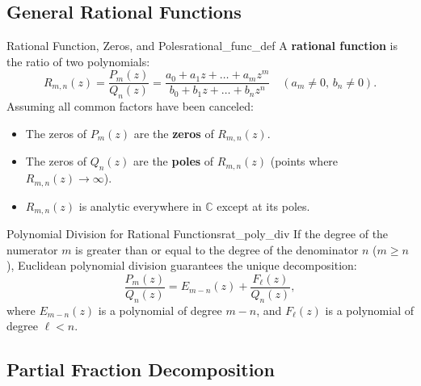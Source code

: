 \subsection{General Rational Functions}

\begin{definition}{Rational Function, Zeros, and Poles}{rational_func_def}
A \textbf{rational function} is the ratio of two polynomials:
\begin{equation}
R_{m, n}(z) = \frac{P_m(z)}{Q_n(z)} = \frac{a_0 + a_1 z + \dots + a_m z^m}{b_0 + b_1 z + \dots + b_n z^n} \quad (a_m \neq 0, \, b_n \neq 0).
\end{equation}
Assuming all common factors have been canceled:
\begin{itemize}
    \item The zeros of $P_m(z)$ are the \textbf{zeros} of $R_{m, n}(z)$.
    \item The zeros of $Q_n(z)$ are the \textbf{poles} of $R_{m, n}(z)$ (points where $R_{m, n}(z) \to \infty$).
    \item $R_{m, n}(z)$ is analytic everywhere in $\mathbb{C}$ except at its poles.
\end{itemize}
\end{definition}

\begin{proposition}{Polynomial Division for Rational Functions}{rat_poly_div}
If the degree of the numerator $m$ is greater than or equal to the degree of the denominator $n$ ($m \ge n$), Euclidean polynomial division guarantees the unique decomposition:
\begin{equation}
\frac{P_m(z)}{Q_n(z)} = E_{m-n}(z) + \frac{F_\ell(z)}{Q_n(z)},
\end{equation}
where $E_{m-n}(z)$ is a polynomial of degree $m-n$, and $F_\ell(z)$ is a polynomial of degree $\ell < n$.
\end{proposition}

\subsection{Partial Fraction Decomposition}

